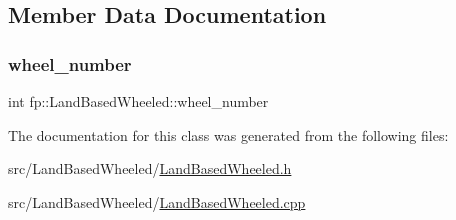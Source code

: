 \subsection{Member Data Documentation}
\mbox{\label{classfp_1_1_land_based_wheeled_ac50206eb412222a4d3c8f494c5dbd09b}} 
\subsubsection{\texorpdfstring{wheel\+\_\+number}{wheel\_number}}
{\footnotesize\ttfamily int fp\+::\+Land\+Based\+Wheeled\+::wheel\+\_\+number\hspace{0.3cm}{\ttfamily [protected]}}



The documentation for this class was generated from the following files\+:\begin{DoxyCompactItemize}
\item 
src/\+Land\+Based\+Wheeled/\hyperlink{_land_based_wheeled_8h}{Land\+Based\+Wheeled.\+h}\item 
src/\+Land\+Based\+Wheeled/\hyperlink{_land_based_wheeled_8cpp}{Land\+Based\+Wheeled.\+cpp}\end{DoxyCompactItemize}
